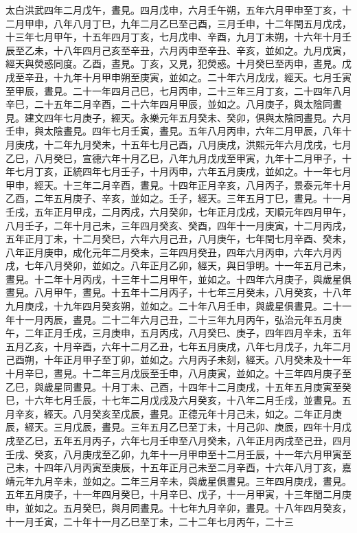\begin{pinyinscope}
太白洪武四年二月戊午，晝見。四月戊申，六月壬午朔，五年六月甲申至丁亥，十二月甲申，八年八月丁巳，九年二月乙巳至己酉，三月壬申，十二年閏五月戊戌，十三年七月甲午，十五年四月丁亥，七月戊申、辛酉，九月丁未朔，十六年十月壬辰至乙未，十八年四月己亥至辛丑，六月丙申至辛丑、辛亥，並如之。九月戊寅，經天與熒惑同度。乙酉，晝見。丁亥，又見，犯熒惑。十月癸巳至丙申，晝見。戊戌至辛丑，十九年十月甲申朔至庚寅，並如之。二十年六月戊戌，經天。七月壬寅至甲辰，晝見。二十一年四月己巳，七月丙申，二十三年三月丁亥，二十四年八月辛巳，二十五年二月辛酉，二十六年四月甲辰，並如之。八月庚子，與太陰同晝見。建文四年七月庚子，經天。永樂元年五月癸未、癸卯，俱與太陰同晝見。六月壬申，與太陰晝見。四年七月壬寅，晝見。五年八月丙申，六年二月甲辰，八年十月庚戌，十二年九月癸未，十五年七月己酉，八月庚戌，洪熙元年六月戊戌，七月乙巳，八月癸巳，宣德六年十月乙巳，八年九月戊戌至甲寅，九年十二月甲子，十年七月丁亥，正統四年七月壬子，十月丙申，六年五月庚戌，並如之。十一年七月甲申，經天。十三年二月辛酉，晝見。十四年正月辛亥，八月丙子，景泰元年十月乙酉，二年五月庚子、辛亥，並如之。壬子，經天。三年五月丁巳，晝見。十一月壬戌，五年正月甲戌，二月丙戌，六月癸卯，七年正月戊戌，天順元年四月甲午，八月壬子，二年十月己未，三年四月癸亥、癸酉，四年十一月庚寅，十二月丙戌，五年正月丁未，十二月癸巳，六年六月己丑，八月庚午，七年閏七月辛酉、癸未，八年正月庚申，成化元年二月癸未，三年四月癸丑，四年六月丙申，六年六月丙戌，七年八月癸卯，並如之。八年正月乙卯，經天，與日爭明。十一年五月己未，晝見。十二年十月丙戌，十三年十二月甲午，並如之。十四年六月庚子，與歲星俱晝見。八月甲午，晝見。十五年十二月丙子，十七年三月癸未，八月癸亥，十八年九月庚戌，十九年四月癸亥朔，並如之。二十年八月壬申，與歲星俱晝見。二十一年十一月丙辰，晝見。二十二年六月己丑，二十三年九月丙午，弘治元年五月庚午，二年正月壬戌，三月庚申，五月丙戌，八月癸巳、庚子，四年四月辛未，五年五月乙亥，十月辛酉，六年十二月乙丑，七年五月庚戌，八年七月戊子，九年二月己酉朔，十年正月甲子至丁卯，並如之。六月丙子未刻，經天。八月癸未及十一年十月辛巳，晝見。十二年三月戊辰至壬申，八月庚寅，並如之。十三年四月庚子至乙巳，與歲星同晝見。十月丁未、己酉，十四年十二月庚戌，十五年五月庚寅至癸巳，十六年七月壬辰，十七年二月戊戌及六月癸亥，十八年二月壬戌，並晝見。五月辛亥，經天。八月癸亥至戊辰，晝見。正德元年十月己未，如之。二年正月庚辰，經天。三月戊辰，晝見。三年五月乙巳至丁未，十月己卯、庚辰，四年十月戊戌至乙巳，五年五月丙子，六年七月壬申至八月癸未，八年正月丙戌至己丑，四月壬戌、癸亥，八月庚戌至乙卯，九年十一月甲申至十二月壬辰，十一年六月甲寅至己未，十四年八月丙寅至庚辰，十五年正月己未至二月辛酉，十六年八月丁亥，嘉靖元年九月辛未，並如之。二年三月辛未，與歲星俱晝見。三年四月庚戌，晝見。五年五月庚子，十一年四月癸巳，十月辛巳、戊子，十一月甲寅，十三年閏二月庚申，並如之。五月癸巳，與月同晝見。十七年九月辛卯，晝見。十八年四月癸亥，十一月壬寅，二十年十一月乙巳至丁未，二十二年七月丙午，二十三
\end{pinyinscope}
